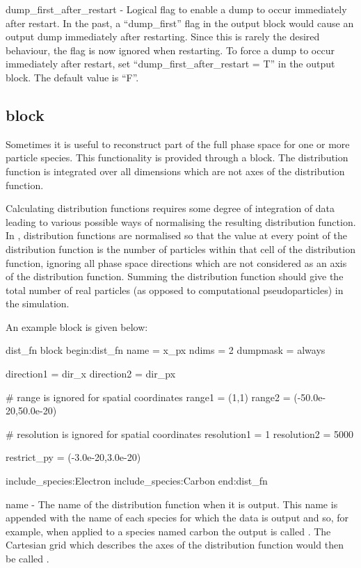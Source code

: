 {\emphtext dump\_first\_after\_restart} - Logical flag to enable a dump to
occur immediately after restart.
In the past, a ``dump\_first'' flag in the output block would cause
an output dump immediately after restarting. Since this is rarely
the desired behaviour, the flag is now ignored when restarting.
To force a dump to occur immediately after restart, set
``dump\_first\_after\_restart = T'' in the output block. The default value
is ``F''.


\subsection{ block}
\label{sec:dist_fn_block}

Sometimes it is useful to reconstruct part of the
full phase space for one or more particle species.
This functionality is provided through a  block. The
distribution function is integrated over all dimensions which are not axes of
the distribution function.

Calculating distribution functions requires some degree of integration of data
leading to various possible ways of normalising the resulting distribution
function. In {\EPOCH}, distribution functions are normalised so that the value
at every point of the distribution function is the number of particles within
that cell of the distribution function, ignoring all phase space directions
which are not considered as an axis of the distribution function. Summing the
distribution function should give the total number of real particles
(as opposed to computational pseudoparticles) in the
simulation.

An example  block is given below:
{\samepage
\begin{lboxverbatim}{dist\_fn block}
begin:dist_fn
   name = x_px
   ndims = 2
   dumpmask = always

   direction1 = dir_x
   direction2 = dir_px

   # range is ignored for spatial coordinates
   range1 = (1,1)
   range2 = (-50.0e-20,50.0e-20)

   # resolution is ignored for spatial coordinates
   resolution1 = 1
   resolution2 = 5000

   restrict_py = (-3.0e-20,3.0e-20)

   include_species:Electron
   include_species:Carbon
end:dist_fn
\end{lboxverbatim}
}

{\emphtext name} - The name of the distribution function when it is
output. This name is appended with the name of each species for which the data
is output and so, for example, when applied to a species named
carbon the output is called . The Cartesian grid
which describes the axes of the distribution function would then be called
.\\


